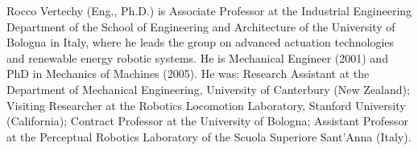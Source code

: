 \begin{IEEEbiography}{Rocco Vertechy} (Eng., Ph.D.)  is Associate Professor at the Industrial Engineering Department of the School of Engineering and Architecture of the University of Bologna in Italy, where he leads the group on advanced actuation technologies and renewable energy robotic systems. He is Mechanical Engineer (2001) and PhD in Mechanics of Machines (2005). He was: Research Assistant at the Department of Mechanical Engineering, University of Canterbury (New Zealand); Visiting Researcher at the Robotics Locomotion Laboratory, Stanford University (California); Contract Professor at the University of Bologna; Assistant Professor at the Perceptual Robotics Laboratory of the Scuola Superiore Sant’Anna (Italy).
	
\end{IEEEbiography}



